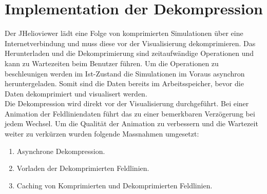 \section{Implementation der Dekompression}
Der JHelioviewer lädt eine Folge von komprimierten Simulationen über eine Internetverbindung und muss diese vor der Visualisierung dekomprimieren. Das Herunterladen und die Dekomprimierung sind zeitaufwändige Operationen und kann zu Wartezeiten beim Benutzer führen. Um die Operationen zu beschleunigen werden im Ist-Zustand die Simulationen im Voraus asynchron heruntergeladen. Somit sind die Daten bereits im Arbeitsspeicher, bevor die Daten dekomprimiert und visualisert werden.\\
Die Dekompression wird direkt vor der Visualisierung durchgeführt. Bei einer Animation der Feldliniendaten führt das zu einer bemerkbaren Verzögerung bei jedem Wechsel. Um die Qualität der Animation zu verbessern und die Wartezeit weiter zu verkürzen wurden folgende Massnahmen umgesetzt:
\begin{enumerate}
	\item Asynchrone Dekompression.
	\item Vorladen der Dekomprimierten Feldlinien.
	\item Caching von Komprimierten und Dekomprimierten Feldlinien.
\end{enumerate}

